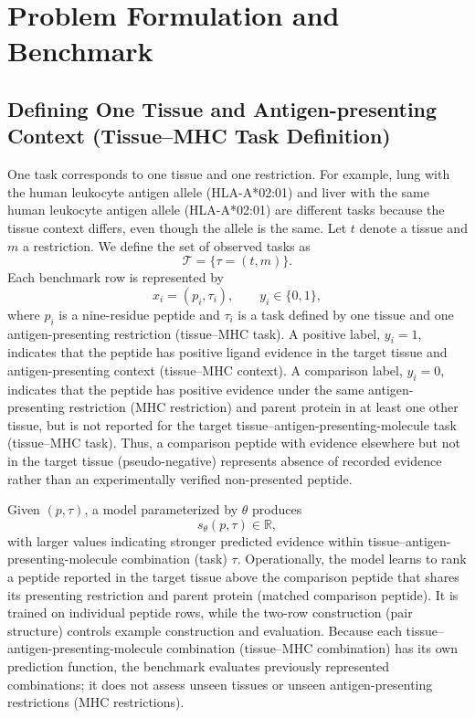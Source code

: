 \section{Problem Formulation and Benchmark}

\subsection{Defining One Tissue and Antigen-presenting Context (Tissue--MHC Task Definition)}

One task corresponds to one tissue and one \plainMHCI{} restriction. For example, lung with the human leukocyte antigen allele (HLA-A*02:01) and liver with the same human leukocyte antigen allele (HLA-A*02:01) are different tasks because the tissue context differs, even though the allele is the same. Let \(t\) denote a tissue and \(m\) a \plainMHCI{} restriction. We define the set of observed tasks as
\[
\mathcal{T}=\{\tau=(t,m)\}.
\]
Each benchmark row is represented by
\[
x_i=(p_i,\tau_i), \qquad y_i\in\{0,1\},
\]
where \(p_i\) is a nine-residue peptide and \(\tau_i\) is a task defined by one tissue and one antigen-presenting restriction (tissue--MHC task). A positive label, \(y_i=1\), indicates that the peptide has positive ligand evidence in the target tissue and antigen-presenting context (tissue--MHC context). A comparison label, \(y_i=0\), indicates that the peptide has positive evidence under the same antigen-presenting restriction (MHC restriction) and parent protein in at least one other tissue, but is not reported for the target tissue--antigen-presenting-molecule task (tissue--MHC task). Thus, a comparison peptide with evidence elsewhere but not in the target tissue (pseudo-negative) represents absence of recorded evidence rather than an experimentally verified non-presented peptide.

Given \((p,\tau)\), a model parameterized by \(\theta\) produces
\[
s_{\theta}(p,\tau)\in\mathbb{R},
\]
with larger values indicating stronger predicted evidence within tissue--antigen-presenting-molecule combination (task) \(\tau\). Operationally, the model learns to rank a peptide reported in the target tissue above the comparison peptide that shares its presenting restriction and parent protein (matched comparison peptide). It is trained on individual peptide rows, while the two-row construction (pair structure) controls example construction and evaluation. Because each tissue--antigen-presenting-molecule combination (tissue--MHC combination) has its own prediction function, the benchmark evaluates previously represented combinations; it does not assess unseen tissues or unseen antigen-presenting restrictions (MHC restrictions).

